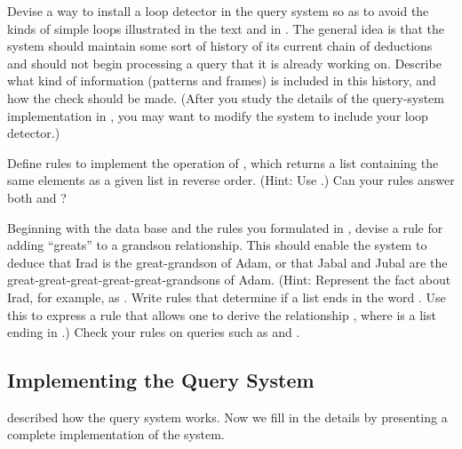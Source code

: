 \begin{exercise}
	\label{Exercise 4.67}
	Devise a way to install a loop detector in the query system so as to avoid the kinds of simple loops illustrated in the text and in .
	The general idea is that the system should maintain some sort of history of its current chain of deductions and should not begin processing a query that it is already working on.
	Describe what kind of information (patterns and frames) is included in this history, and how the check should be made.
	(After you study the details of the query-system implementation in , you may want to modify the system to include your loop detector.)
\end{exercise}



\begin{exercise}
	\label{Exercise 4.68}
	Define rules to implement the  operation of , which returns a list containing the same elements as a given list in reverse order.
	(Hint: Use .)
	Can your rules answer both  and  ?
\end{exercise}



\begin{exercise}
	\label{Exercise 4.69}
	Beginning with the data base and the rules you formulated in , devise a rule for adding “greats” to a grandson relationship.
	This should enable the system to deduce that Irad is the great-grandson of Adam, or that Jabal and Jubal are the great-great-great-great-great-grandsons of Adam.
	(Hint:
	Represent the fact about Irad, for example, as .
	Write rules that determine if a list ends in the word .
	Use this to express a rule that allows one to derive the relationship , where  is a list ending in .)
	Check your rules on queries such as  and .
\end{exercise}



\subsection{Implementing the Query System}
\label{Section 4.4.4}

 described how the query system works.
Now we fill in the details by presenting a complete implementation of the system.



